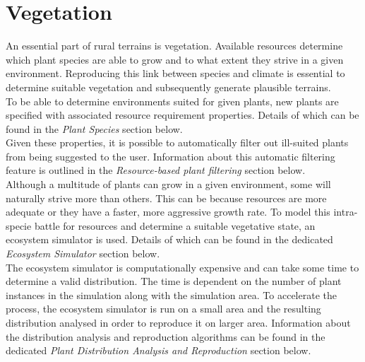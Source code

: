 \chapter{Vegetation}

An essential part of rural terrains is vegetation. Available resources determine which plant species are able to grow and to what extent they strive in a given environment. Reproducing this link between species and climate is essential to determine suitable vegetation and subsequently generate plausible terrains. \\

To be able to determine environments suited for given plants, new plants are specified with associated resource requirement properties. Details of which can be found in the \textit{Plant Species} section below.\\
Given these properties, it is possible to automatically filter out ill-suited plants from being suggested to the user. Information about this automatic filtering feature is outlined in the \textit{Resource-based plant filtering} section below.\\

Although a multitude of plants can grow in a given environment, some will naturally strive more than others. This can be because resources are more adequate or they have a faster, more aggressive growth rate. To model this intra-specie battle for resources and  determine a suitable vegetative state, an ecosystem simulator is used. Details of which can be found in the dedicated \textit{Ecosystem Simulator} section below.\\

The ecosystem simulator is computationally expensive and can take some time to determine a valid distribution. The time is dependent on the number of plant instances in the simulation along with the simulation area. To accelerate the process, the ecosystem simulator is run on a small area and the resulting distribution analysed in order to reproduce it on larger area. Information about the distribution analysis and reproduction algorithms can be found in the dedicated \textit{Plant Distribution Analysis and Reproduction} section below.
